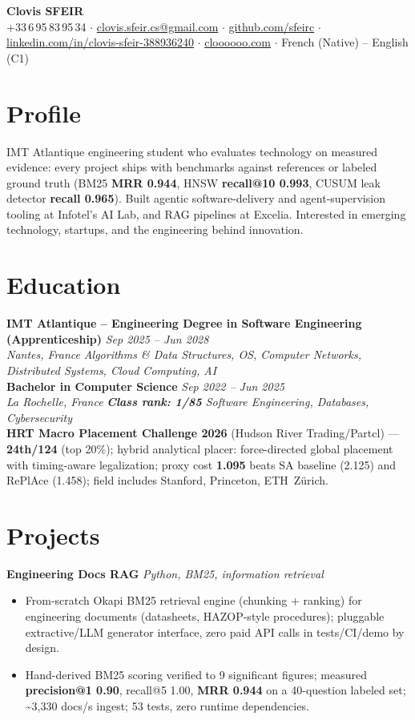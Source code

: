 \documentclass[10pt]{article}
\newcommand{\entry}[4]{%
  \noindent\textbf{#1} \hfill \textit{#2} \\
  \textit{#3} \hfill \textit{#4}\\[-0.22em]
}
\newcommand{\projectentry}[2]{%
  \noindent\textbf{#1} \hfill \textit{#2}\\[-0.3em]
}
\begin{document}
\fontsize{9.3pt}{11pt}\selectfont
\begin{center}
  {\LARGE \textbf{Clovis SFEIR}}\\[0.3em]
  +33\,6\,95\,83\,95\,34 \;$\cdot$\; \href{mailto:clovis.sfeir.cs@gmail.com}{clovis.sfeir.cs@gmail.com} \;$\cdot$\;
  \href{https://github.com/sfeirc}{github.com/sfeirc} \;$\cdot$\;
  \href{https://linkedin.com/in/clovis-sfeir-388936240}{linkedin.com/in/clovis-sfeir-388936240} \;$\cdot$\;
  \href{https://cloooooo.com}{cloooooo.com} \;$\cdot$\; French (Native) -- English (C1)
\end{center}

\section*{Profile}
IMT Atlantique engineering student who evaluates technology on measured evidence: every project ships with benchmarks against references or labeled ground truth (BM25 \textbf{MRR 0.944}, HNSW \textbf{recall@10 0.993}, CUSUM leak detector \textbf{recall 0.965}). Built agentic software-delivery and agent-supervision tooling at Infotel's AI Lab, and RAG pipelines at Excelia. Interested in emerging technology, startups, and the engineering behind innovation.

\section*{Education}
\entry{IMT Atlantique -- Engineering Degree in Software Engineering (Apprenticeship)}{Sep 2025 -- Jun 2028}{Nantes, France}{Algorithms \& Data Structures, OS, Computer Networks, Distributed Systems, Cloud Computing, AI}
\entry{Bachelor in Computer Science}{Sep 2022 -- Jun 2025}{La Rochelle, France}{\textbf{Class rank: 1/85} \textbar{} Software Engineering, Databases, Cybersecurity}
\noindent\textbf{HRT Macro Placement Challenge 2026} (Hudson River Trading/Partcl) --- \textbf{24th/124} (top 20\%); hybrid analytical placer: force-directed global placement with timing-aware legalization; proxy cost \textbf{1.095} beats SA baseline (2.125) and RePlAce (1.458); field includes Stanford, Princeton, ETH~Z\"urich.

\section*{Projects}

\projectentry{Engineering Docs RAG}{Python, BM25, information retrieval}
\begin{itemize}
  \item From-scratch Okapi BM25 retrieval engine (chunking + ranking) for engineering documents (datasheets, HAZOP-style procedures); pluggable extractive/LLM generator interface, zero paid API calls in tests/CI/demo by design.
  \item Hand-derived BM25 scoring verified to 9 significant figures; measured \textbf{precision@1 0.90}, recall@5 1.00, \textbf{MRR 0.944} on a 40-question labeled set; \textasciitilde3{,}330 docs/s ingest; 53 tests, zero runtime dependencies.
\end{itemize}
\end{document}
